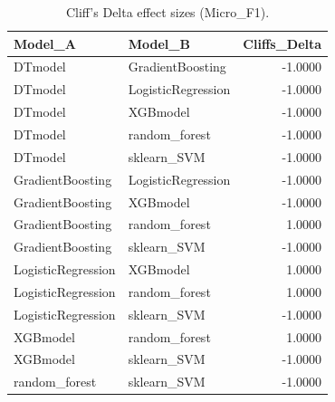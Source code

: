 \begin{table}[t]
\centering
\begin{tabular}{llr}
\toprule
Model_A & Model_B & Cliffs_Delta \\
\midrule
DTmodel & GradientBoosting & -1.0000 \\
DTmodel & LogisticRegression & -1.0000 \\
DTmodel & XGBmodel & -1.0000 \\
DTmodel & random_forest & -1.0000 \\
DTmodel & sklearn_SVM & -1.0000 \\
GradientBoosting & LogisticRegression & -1.0000 \\
GradientBoosting & XGBmodel & -1.0000 \\
GradientBoosting & random_forest & 1.0000 \\
GradientBoosting & sklearn_SVM & -1.0000 \\
LogisticRegression & XGBmodel & 1.0000 \\
LogisticRegression & random_forest & 1.0000 \\
LogisticRegression & sklearn_SVM & -1.0000 \\
XGBmodel & random_forest & 1.0000 \\
XGBmodel & sklearn_SVM & -1.0000 \\
random_forest & sklearn_SVM & -1.0000 \\
\bottomrule
\end{tabular}
\caption{Cliff's Delta effect sizes (Micro_F1).}
\label{tab:cliffs_Micro_F1}
\end{table}